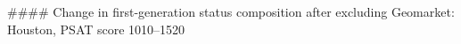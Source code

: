#### Change in first-generation status composition after excluding Geomarket: Houston, PSAT score 1010–1520
